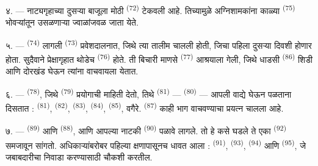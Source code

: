 ४. --- नाट्यगृहाच्या दुसऱ्या बाजूला मोठी  \textsuperscript{(72)} टेकवली आहे.
तिच्यामुळे अग्निशामकांना काळ्या  \textsuperscript{(75)} भोवऱ्यांतून उसळणाऱ्या
ज्वाळांजवळ जाता येते.

\VUsaut{5.0mm}
\VUsaut{3.4mm}

५. ---  \textsuperscript{(74)} लागली  \textsuperscript{(73)}
प्रवेशदालनात, जिथे त्या  तालीम चालली होती, जिचा पहिला 
दुसऱ्या दिवशी होणार होता. सुदैवाने प्रेक्षागृहात थोडेच 
\textsuperscript{(76)} होते. ती बिचारी माणसे  \textsuperscript{(77)}
आश्रयाला गेली, जिथे धाडसी  \textsuperscript{(86)} शिडी आणि दोरखंड घेऊन
त्यांना वाचवायला येतात.

६. ---  \textsuperscript{(78)}, जिथे 
\textsuperscript{(79)} प्रयोगाची माहिती देतो, तिथे  \textsuperscript{(81)} —
 \textsuperscript{(80)} — आपली वाद्ये घेऊन पळताना दिसतात :
 \textsuperscript{(81)},  \textsuperscript{(82)},
 \textsuperscript{(83)},  \textsuperscript{(84)},
 \textsuperscript{(85)}, वगैरे.  \textsuperscript{(87)} काही भाग
वाचवण्याचा प्रयत्न चालला आहे.

७. ---  \textsuperscript{(89)} आणि  \textsuperscript{(88)},
 आणि  आपल्या नाटकी 
\textsuperscript{(90)} पळावे लागले. तो हे कसे घडले ते एका 
\textsuperscript{(92)} समजावून सांगतो.  अधिकाऱ्यांबरोबर पहिल्या क्षणापासूनच
धावत आला :  \textsuperscript{(91)}, 
\textsuperscript{(93)},  \textsuperscript{(94)} आणि 
\textsuperscript{(95)}, जे जबाबदारीचा निवाडा करण्यासाठी चौकशी करतील.

\VUsaut{6.0mm}
\VUfilet{22mm}
